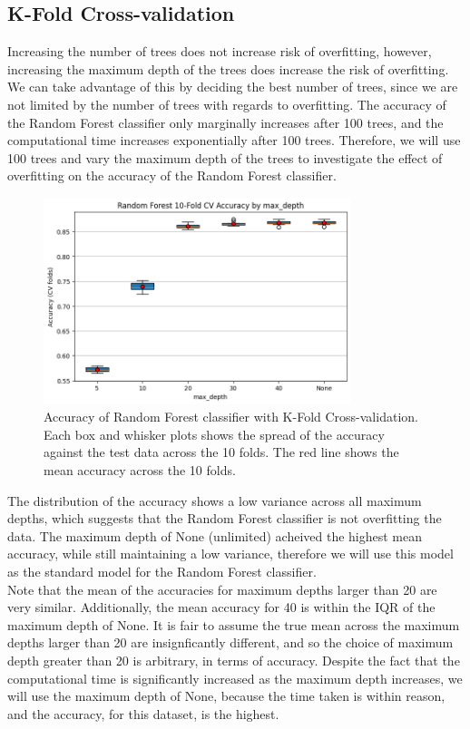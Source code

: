 \documentclass[12pt]{article}
\begin{document}
\vspace{20pt}

\subsection{K-Fold Cross-validation}
\noindent
Increasing the number of trees does not increase risk of overfitting, however, increasing the maximum depth of the trees does increase the risk of overfitting. We can take advantage of this by deciding the best number of trees, since we are not limited by the number of trees with regards to overfitting. The accuracy of the Random Forest classifier only marginally increases after 100 trees, and the computational time increases exponentially after 100 trees. Therefore, we will use 100 trees and vary the maximum depth of the trees to investigate the effect of overfitting on the accuracy of the Random Forest classifier.

\begin{figure}[H]
\centering
\includegraphics[width=0.8\textwidth]{figures/rf_accuracy_kfold.png}
\caption{Accuracy of Random Forest classifier with K-Fold Cross-validation. Each box and whisker plots shows the spread of the accuracy against the test data across the 10 folds. The red line shows the mean accuracy across the 10 folds.}
\label{fig:rf_accuracy_kfold}
\end{figure}

The distribution of the accuracy shows a low variance across all maximum depths, which suggests that the Random Forest classifier is not overfitting the data. The maximum depth of None (unlimited) acheived the highest mean accuracy, while still maintaining a low variance, therefore we will use this model as the standard model for the Random Forest classifier. 
\\
Note that the mean of the accuracies for maximum depths larger than 20 are very similar. Additionally, the mean accuracy for 40 is within the IQR of the maximum depth of None. It is fair to assume the true mean across the maximum depths larger than 20 are insignficantly different, and so the choice of maximum depth greater than 20 is arbitrary, in terms of accuracy. Despite the fact that the computational time is significantly increased as the maximum depth increases, we will use the maximum depth of None, because the time taken is within reason, and the accuracy, for this dataset, is the highest.
\end{document}

